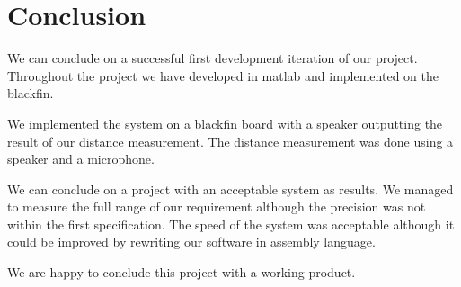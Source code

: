 \chapter{Conclusion}
We can conclude on a successful first development iteration of our project. Throughout the project we have developed in matlab and implemented on the blackfin.

We implemented the system on a blackfin board with a speaker outputting the result of our distance measurement. The distance measurement was done using a speaker and a microphone.

We can conclude on a project with an acceptable system as results. We managed to measure the full range of our requirement although the precision was not within the first specification. The speed of the system was acceptable although it could be improved by rewriting our software in assembly language. 

We are happy to conclude this project with a working product.